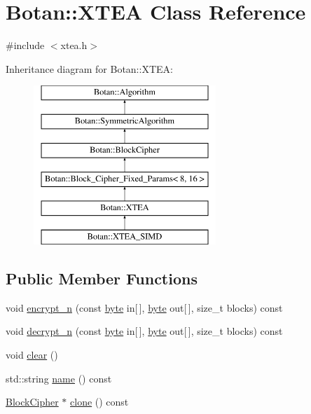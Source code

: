 \hypertarget{classBotan_1_1XTEA}{\section{Botan\-:\-:X\-T\-E\-A Class Reference}
\label{classBotan_1_1XTEA}
}


{\ttfamily \#include $<$xtea.\-h$>$}

Inheritance diagram for Botan\-:\-:X\-T\-E\-A\-:\begin{figure}[H]
\begin{center}
\leavevmode
\includegraphics[height=6.000000cm]{classBotan_1_1XTEA}
\end{center}
\end{figure}
\subsection*{Public Member Functions}
\begin{DoxyCompactItemize}
\item 
void \hyperlink{classBotan_1_1XTEA_ae0fe0c8b76bc8d25809756249b984152}{encrypt\-\_\-n} (const \hyperlink{namespaceBotan_a7d793989d801281df48c6b19616b8b84}{byte} in\mbox{[}$\,$\mbox{]}, \hyperlink{namespaceBotan_a7d793989d801281df48c6b19616b8b84}{byte} out\mbox{[}$\,$\mbox{]}, size\-\_\-t blocks) const 
\item 
void \hyperlink{classBotan_1_1XTEA_a1b1481b18d8745ec314025ec6b023f50}{decrypt\-\_\-n} (const \hyperlink{namespaceBotan_a7d793989d801281df48c6b19616b8b84}{byte} in\mbox{[}$\,$\mbox{]}, \hyperlink{namespaceBotan_a7d793989d801281df48c6b19616b8b84}{byte} out\mbox{[}$\,$\mbox{]}, size\-\_\-t blocks) const 
\item 
void \hyperlink{classBotan_1_1XTEA_a5590604a649e7273c61b281f8edf6c3e}{clear} ()
\item 
std\-::string \hyperlink{classBotan_1_1XTEA_a3bd46fdd16cc23719cc60ff2537353b3}{name} () const 
\item 
\hyperlink{classBotan_1_1BlockCipher}{Block\-Cipher} $\ast$ \hyperlink{classBotan_1_1XTEA_adad786965739b18b7b8c5034c7ca93f2}{clone} () const 
\end{DoxyCompactItemize}
